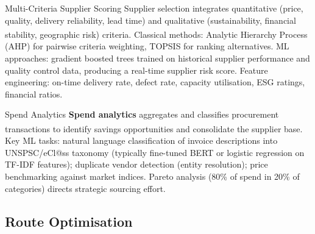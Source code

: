 \begin{v3topic}{Multi-Criteria Supplier Scoring}
    Supplier selection integrates quantitative (price, quality, delivery reliability, lead time) and qualitative (sustainability, financial stability, geographic risk) criteria\textsuperscript{\cite[][pp.~308--314]{chopraSupplyChainManagement2019}}.
    Classical methods: Analytic Hierarchy Process (AHP) for pairwise criteria weighting, TOPSIS for ranking alternatives.
    ML approaches: gradient boosted trees trained on historical supplier performance and quality control data, producing a real-time supplier risk score.
    Feature engineering: on-time delivery rate, defect rate, capacity utilisation, ESG ratings, financial ratios.

\end{v3topic}
\begin{v3topic}{Spend Analytics}
    \textbf{Spend analytics} aggregates and classifies procurement transactions to identify savings opportunities and consolidate the supplier base\textsuperscript{\cite[][pp.~316--320]{chopraSupplyChainManagement2019}}.
    Key ML tasks: natural language classification of invoice descriptions into UNSPSC/eCl@ss taxonomy (typically fine-tuned BERT or logistic regression on TF-IDF features); duplicate vendor detection (entity resolution); price benchmarking against market indices.
    Pareto analysis (80\% of spend in 20\% of categories) directs strategic sourcing effort.

\end{v3topic}

\subsection{Route Optimisation}


